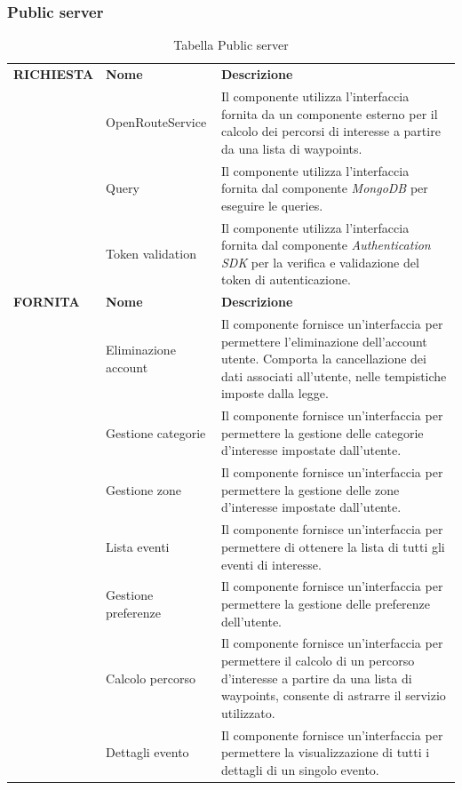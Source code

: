 \documentclass{article}
\begin{document}
\clearpage

\subsubsection{Public server}

\begin{table}[htbp]
    \centering
    \renewcommand{\arraystretch}{1.3} %
    \begin{tabularx}{\textwidth}{| l | l | X |}
        \Xhline{2pt}
        \textbf{RICHIESTA} & \textbf{Nome} & \textbf{Descrizione} \\
        \Xhline{2pt}
         & OpenRouteService & Il componente utilizza l'interfaccia fornita da un componente esterno per il calcolo dei percorsi di interesse a partire da una lista di waypoints. \\
        \hline
         & Query & Il componente utilizza l'interfaccia fornita dal componente \textit{MongoDB} per eseguire le queries. \\
        \hline
         & Token validation & Il componente utilizza l'interfaccia fornita dal componente \textit{Authentication SDK} per la verifica e validazione del token di autenticazione. \\
        \Xhline{2pt}
        \textbf{FORNITA} & \textbf{Nome} & \textbf{Descrizione} \\
        \Xhline{2pt}
         & Eliminazione account & Il componente fornisce un'interfaccia per permettere l'eliminazione dell'account utente. Comporta la cancellazione dei dati associati all'utente, nelle tempistiche imposte dalla legge. \\
        \hline
         & Gestione categorie & Il componente fornisce un'interfaccia per permettere la gestione delle categorie d'interesse impostate dall'utente. \\
        \hline
        & Gestione zone & Il componente fornisce un'interfaccia per permettere la gestione delle zone d'interesse impostate dall'utente. \\
        \hline
        & Lista eventi & Il componente fornisce un'interfaccia per permettere di ottenere la lista di tutti gli eventi di interesse. \\
        \hline
        & Gestione preferenze & Il componente fornisce un'interfaccia per permettere la gestione delle preferenze dell'utente. \\
        \hline
        & Calcolo percorso & Il componente fornisce un'interfaccia per permettere il calcolo di un percorso d'interesse a partire da una lista di waypoints, consente di astrarre il servizio utilizzato. \\
        \hline
        & Dettagli evento & Il componente fornisce un'interfaccia per permettere la visualizzazione di tutti i dettagli di un singolo evento. \\
        \hline
    \end{tabularx}
    \caption{Tabella Public server}
\end{table}
\end{document}
